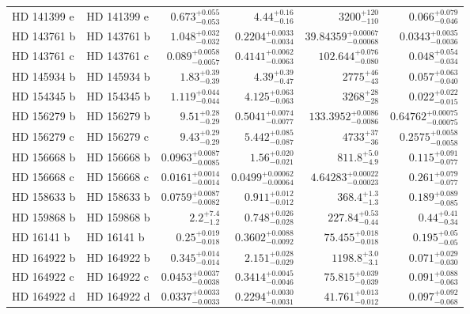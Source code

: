 \begin{longtable*}{llrrrr}
HD 141399 e & HD 141399 e & $0.673^{+0.055}_{-0.053}$ & $4.44^{+0.16}_{-0.16}$ & $3200^{+120}_{-110}$ & $0.066^{+0.079}_{-0.046}$ \\ 
HD 143761 b & HD 143761 b & $1.048^{+0.032}_{-0.032}$ & $0.2204^{+0.0033}_{-0.0034}$ & $39.84359^{+0.00067}_{-0.00068}$ & $0.0343^{+0.0035}_{-0.0036}$ \\ 
HD 143761 c & HD 143761 c & $0.089^{+0.0058}_{-0.0057}$ & $0.4141^{+0.0062}_{-0.0063}$ & $102.644^{+0.076}_{-0.080}$ & $0.048^{+0.054}_{-0.034}$ \\ 
HD 145934 b & HD 145934 b & $1.83^{+0.39}_{-0.39}$ & $4.39^{+0.39}_{-0.47}$ & $2775^{+46}_{-43}$ & $0.057^{+0.063}_{-0.040}$ \\ 
HD 154345 b & HD 154345 b & $1.119^{+0.044}_{-0.044}$ & $4.125^{+0.063}_{-0.063}$ & $3268^{+28}_{-28}$ & $0.022^{+0.022}_{-0.015}$ \\ 
HD 156279 b & HD 156279 b & $9.51^{+0.28}_{-0.29}$ & $0.5041^{+0.0074}_{-0.0077}$ & $133.3952^{+0.0086}_{-0.0086}$ & $0.64762^{+0.00075}_{-0.00075}$ \\ 
HD 156279 c & HD 156279 c & $9.43^{+0.29}_{-0.29}$ & $5.442^{+0.085}_{-0.087}$ & $4733^{+37}_{-36}$ & $0.2575^{+0.0058}_{-0.0058}$ \\ 
HD 156668 b & HD 156668 b & $0.0963^{+0.0087}_{-0.0085}$ & $1.56^{+0.020}_{-0.021}$ & $811.8^{+5.0}_{-4.9}$ & $0.115^{+0.091}_{-0.077}$ \\ 
HD 156668 c & HD 156668 c & $0.0161^{+0.0014}_{-0.0014}$ & $0.0499^{+0.00062}_{-0.00064}$ & $4.64283^{+0.00022}_{-0.00023}$ & $0.261^{+0.079}_{-0.077}$ \\ 
HD 158633 b & HD 158633 b & $0.0759^{+0.0087}_{-0.0082}$ & $0.911^{+0.012}_{-0.012}$ & $368.4^{+1.3}_{-1.3}$ & $0.189^{+0.089}_{-0.085}$ \\ 
HD 159868 b & HD 159868 b & $2.2^{+7.4}_{-1.2}$ & $0.748^{+0.026}_{-0.028}$ & $227.84^{+0.53}_{-0.44}$ & $0.44^{+0.41}_{-0.34}$ \\ 
HD 16141 b & HD 16141 b & $0.25^{+0.019}_{-0.018}$ & $0.3602^{+0.0088}_{-0.0092}$ & $75.455^{+0.018}_{-0.018}$ & $0.195^{+0.05}_{-0.05}$ \\ 
HD 164922 b & HD 164922 b & $0.345^{+0.014}_{-0.014}$ & $2.151^{+0.028}_{-0.029}$ & $1198.8^{+3.0}_{-3.1}$ & $0.071^{+0.029}_{-0.030}$ \\ 
HD 164922 c & HD 164922 c & $0.0453^{+0.0037}_{-0.0038}$ & $0.3414^{+0.0045}_{-0.0046}$ & $75.815^{+0.039}_{-0.039}$ & $0.091^{+0.088}_{-0.063}$ \\ 
HD 164922 d & HD 164922 d & $0.0337^{+0.0033}_{-0.0033}$ & $0.2294^{+0.0030}_{-0.0031}$ & $41.761^{+0.013}_{-0.012}$ & $0.097^{+0.092}_{-0.068}$ \\ 

\end{longtable*}
